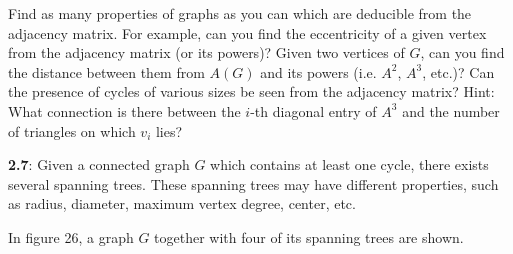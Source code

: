 \documentclass{article}
\begin{document}
Find as many properties of graphs as you can which are deducible from the adjacency matrix. For example, can you find the eccentricity of a given vertex from the adjacency matrix (or its powers)? Given two vertices of $G$, can you find the distance between them from $A(G)$ and its powers (i.e. $A^2$, $A^3$, etc.)? Can the presence of cycles of various sizes be seen from the adjacency matrix? Hint: What connection is there between the $i$-th diagonal entry of $A^3$ and the number of triangles on which $v_i$ lies?

\vspace{0.5cm}

\textbf{2.7}: Given a connected graph $G$ which contains at least one cycle, there exists several spanning trees. These spanning trees may have different properties, such as radius, diameter, maximum vertex degree, center, etc.

In figure 26, a graph $G$ together with four of its spanning trees are shown.
\end{document}
